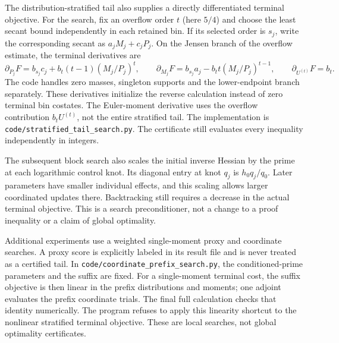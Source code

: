 \documentclass[11pt]{article}
\begin{document}
The distribution-stratified tail also supplies a directly differentiated
terminal objective. For the search, fix an overflow order $t$ (here $5/4$)
and choose the least secant bound independently in each retained bin.
If its selected order is $s_j$, write the corresponding secant as
$a_jM_j+c_jP_j$. On the Jensen branch of the overflow estimate, the
terminal derivatives are
\[
 \partial_{P_j}F=b_{s_j}c_j+b_t(t-1)(M_j/P_j)^t,\qquad
 \partial_{M_j}F=b_{s_j}a_j-b_t t(M_j/P_j)^{t-1},\qquad
 \partial_{U^{(t)}}F=b_t.
\]
The code handles zero masses, singleton supports and the lower-endpoint
branch separately. These derivatives initialize the reverse calculation
instead of zero terminal bin costates. The Euler-moment derivative uses
the overflow contribution $b_tU^{(t)}$, not the entire stratified tail.
The implementation is \texttt{code/stratified\_tail\_search.py}.
The certificate still evaluates every inequality independently in integers.

The subsequent block search also scales the initial inverse Hessian by
the prime at each logarithmic control knot. Its diagonal entry at knot
$q_j$ is $h_0q_j/q_0$. Later parameters have smaller individual effects,
and this scaling allows larger coordinated updates there. Backtracking
still requires a decrease in the actual terminal objective. This is a
search preconditioner, not a change to a proof inequality or a claim of
global optimality.

Additional experiments use a weighted single-moment proxy and coordinate
searches. A proxy score is explicitly labeled in its result file and is
never treated as a certified tail. In
\texttt{code/coordinate\_prefix\_search.py}, the conditioned-prime
parameters and the suffix are fixed. For a single-moment terminal cost,
the suffix objective is then linear in the prefix distributions and
moments; one adjoint evaluates the prefix coordinate trials. The final
full calculation checks that identity numerically. The program refuses
to apply this linearity shortcut to the nonlinear stratified terminal
objective. These are local searches, not global optimality certificates.
\end{document}

